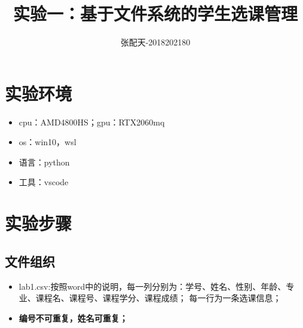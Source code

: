 \documentclass[UTF8]{ctexart}
\title{实验一：基于文件系统的学生选课管理}
\author{张配天-2018202180}
\begin{document}
    \maketitle
    \tableofcontents
    \clearpage
    \section{实验环境}
    \begin{itemize}
        \item cpu：AMD4800HS；gpu：RTX2060mq
        \item os：win10，wsl
        \item 语言：python
        \item 工具：vscode
    \end{itemize}
    \section{实验步骤}
    \subsection{文件组织}
    \begin{itemize}
        \item lab1.csv:按照word中的说明，每一列分别为：学号、姓名、性别、年龄、专业、课程名、课程号、课程学分、课程成绩；
        每一行为一条选课信息；
        \item \textbf{编号不可重复，姓名可重复；}
    \end{itemize}
\end{document}
